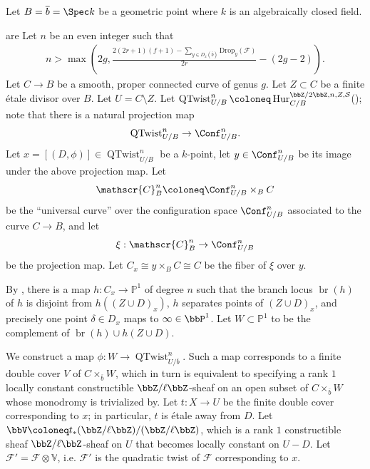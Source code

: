 \begin{proposition}
    Let $B = \overline{b} = \Spec k$ be a geometric point where $k$ is an algebraically closed field.
    
     are
    Let $n$ be an even integer such that 
    \begin{align*}
        n > \max\left(2g,\frac{2(2r+1)(f+1) - \sum_{y \in D_x({\overline b})} \mathrm{Drop}_y(\mathscr F)}{2r} - (2g-2) \right).
    \end{align*}
    Let $C \to B$ be a smooth, proper connected curve of genus $g$. Let $Z \subset C$ be a finite \'etale divisor over $B$. Let $U = C \setminus Z$. 
    Let $\operatorname{QTwist}_{U/B}^n \coloneq \operatorname{Hur}_{C/B}^{\bbZ/2\bbZ, n, Z, \mathcal{S}}$(); note that there is a natural projection map 
    $$\operatorname{QTwist}_{U/B}^n \to \Conf_{U/B}^n.$$
    Let $x = [(D,\phi)] \in \operatorname{QTwist}_{U/B}^n$ be a $k$-point, let $y \in \Conf_{U/B}^n$ be its image under the above projection map. Let 
    $$\mathscr{C}_B^n \coloneq \Conf_{U/B}^n \times_B C$$
    be the ``universal curve'' over the configuration space $\Conf_{U/B}^n$ associated to the curve $C \to B$, and let 
    $$\xi: \mathscr{C}_B^n \to \Conf_{U/B}^n$$
    be the projection map. Let $C_x \cong y \times_B C \cong C$ be the fiber of $\xi$ over $y$. 

    By , there is a map $h: C_x \to \mathbb{P}^1$ of degree $n$ such that the branch locus $\operatorname{br}(h)$ of $h$ is disjoint from $h((Z \cup D)_x)$, $h$ separates points of $(Z \cup D)_x$, and precisely one point $\delta \in D_x$ maps to $\infty \in \bbP^1$. Let $W \subset \mathbb{P}^1$ to be the complement of $\operatorname{br}(h) \cup h(Z \cup D)$. 

    We construct a map $\phi: W \to \operatorname{QTwist}_{U/\overline{b}}^n$. Such a map corresponds to a finite double cover $V$ of $C \times_{\overline{b}} W$, which in turn is equivalent to specifying a rank $1$ locally constant constructible $\bbZ/\ell\bbZ$-sheaf on an open subset of $C \times_{\overline{b}} W$ whose monodromy is trivialized by. Let $t: X \to U$ be the finite double cover corresponding to $x$; in particular, $t$ is \'etale away from $D$. Let $\bbV \coloneq t_* (\bbZ/\ell \bbZ)/(\bbZ/\ell\bbZ)$, which is a rank $1$ constructible sheaf $\bbZ/\ell \bbZ$-sheaf on $U$ that becomes locally constant on $U-D$. Let $\mathscr{F}' = \mathscr{F} \otimes \mathbb{V}$, i.e. $\mathscr{F}'$ is the quadratic twist of $\mathscr{F}$ corresponding to $x$.  
    

\end{proposition}
